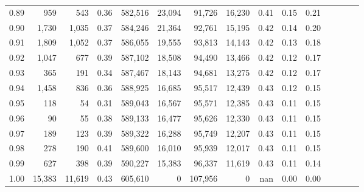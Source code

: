 \begin{tabular}{rrrcrrrrrrrrrrr}
0.89 &     959 &     543 &                                       0.36 &  582,516 &   23,094 &   91,726 &   16,230 &  0.41 &  0.15 &                         0.21 \\
0.90 &   1,730 &   1,035 &                                       0.37 &  584,246 &   21,364 &   92,761 &   15,195 &  0.42 &  0.14 &                         0.20 \\
0.91 &   1,809 &   1,052 &                                       0.37 &  586,055 &   19,555 &   93,813 &   14,143 &  0.42 &  0.13 &                         0.18 \\
0.92 &   1,047 &     677 &                                       0.39 &  587,102 &   18,508 &   94,490 &   13,466 &  0.42 &  0.12 &                         0.17 \\
0.93 &     365 &     191 &                                       0.34 &  587,467 &   18,143 &   94,681 &   13,275 &  0.42 &  0.12 &                         0.17 \\
0.94 &   1,458 &     836 &                                       0.36 &  588,925 &   16,685 &   95,517 &   12,439 &  0.43 &  0.12 &                         0.15 \\
0.95 &     118 &      54 &                                       0.31 &  589,043 &   16,567 &   95,571 &   12,385 &  0.43 &  0.11 &                         0.15 \\
0.96 &      90 &      55 &                                       0.38 &  589,133 &   16,477 &   95,626 &   12,330 &  0.43 &  0.11 &                         0.15 \\
0.97 &     189 &     123 &                                       0.39 &  589,322 &   16,288 &   95,749 &   12,207 &  0.43 &  0.11 &                         0.15 \\
0.98 &     278 &     190 &                                       0.41 &  589,600 &   16,010 &   95,939 &   12,017 &  0.43 &  0.11 &                         0.15 \\
0.99 &     627 &     398 &                                       0.39 &  590,227 &   15,383 &   96,337 &   11,619 &  0.43 &  0.11 &                         0.14 \\
1.00 &  15,383 &  11,619 &                                       0.43 &  605,610 &        0 &  107,956 &        0 &   nan &  0.00 &                         0.00 \\
\bottomrule
\end{tabular}
